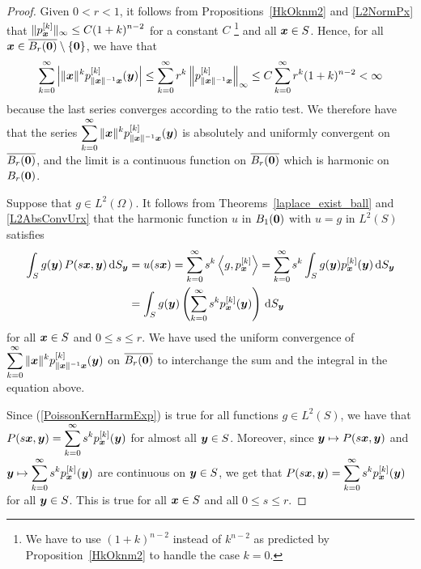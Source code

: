 \begin{proof}
Given $0 < r < 1$, it follows from Propositions~\ref{HkOknm2} and
\ref{L2NormPx} that
$\displaystyle \|p_{{\bm{x}}}^{[k]}\|_\infty \leq C (1+k)^{n-2}$
for a constant $C$ \footnote{We have to use $(1+k)^{n-2}$ instead of
$k^{n-2}$ as predicted by Proposition~\ref{HkOknm2} to handle the case $k=0$.}
and all ${\bm{x}} \in S$.  Hence, for all
${\bm{x}} \in \overline{B_r({\bm{0}})} \setminus\{{\bm{0}}\}$,
we have that
\begin{align*}
\sum_{k=0}^\infty \left| \|{\bm{x}}\|^k
p_{\|{\bm{x}}\|^{-1}{\bm{x}}}^{[k]}({\bm{y}}) \right|
\leq \sum_{k=0}^\infty r^k \left\|p_{\|{\bm{x}}\|^{-1}{\bm{x}}}^{[k]}\right\|_\infty
\leq C \sum_{k=0}^\infty  r^k (1+k)^{n-2}  < \infty
\end{align*}
because the last series converges according to the ratio test.
We therefore have that the series 
$\displaystyle \sum_{k=0}^\infty \|{\bm{x}}\|^k
p_{\|{\bm{x}}\|^{-1}{\bm{x}}}^{[k]}({\bm{y}})$
is absolutely and uniformly
convergent on $\overline{B_r({\bm{0}})}$, and the limit is a continuous
function on $\overline{B_r({\bm{0}})}$ which is harmonic on $B_r({\bm{0}})$.

Suppose that $\displaystyle g \in L^2(\Omega)$.
It follows from Theorems~\ref{laplace_exist_ball} and
\ref{L2AbsConvUrx} that the harmonic function $u$ in
$B_1({\bm{0}})$ with $u=g$ in $\displaystyle L^2(S)$ satisfies
\begin{equation} \label{PoissonKernHarmExp}
\begin{split}
\int_S g({\bm{y}}) \, P(s{\bm{x}},{\bm{y}}) \,\mathrm{d}{S}_{{\bm{y}}}
&= u(s{\bm{x}}) = \sum_{k=0}^\infty s^k \left\langle{g} , {p_{{\bm{x}}}^{[k]}}\right\rangle
= \sum_{k=0}^\infty s^k \int_S g({\bm{y}}) p_{{\bm{x}}}^{[k]}({\bm{y}}) \,\mathrm{d}{S}_{{\bm{y}}} \\
&= \int_S g({\bm{y}}) \left(\sum_{k=0}^\infty s^k
p_{{\bm{x}}}^{[k]}({\bm{y}})\right) \,\mathrm{d}{S}_{{\bm{y}}}
\end{split}
\end{equation}
for all ${\bm{x}} \in S$ and $0 \leq s \leq r$.
We have used the uniform convergence of
$\displaystyle \sum_{k=0}^\infty \|{\bm{x}}\|^k
p_{\|{\bm{x}}\|^{-1}{\bm{x}}}^{[k]}({\bm{y}})$ on
$\displaystyle \overline{B_r({\bm{0}})}$ to interchange the sum
and the integral in the equation above.  

Since (\ref{PoissonKernHarmExp}) is true for all functions
$\displaystyle g\in L^2(S)$,
we have that
$\displaystyle P(s{\bm{x}},{\bm{y}})
= \sum_{k=0}^\infty s^k p_{{\bm{x}}}^{[k]}({\bm{y}})$ for almost all
${\bm{y}} \in S$.  Moreover, since
$\displaystyle {\bm{y}} \mapsto P(s{\bm{x}},{\bm{y}})$ and
$\displaystyle {\bm{y}} \mapsto
\sum_{k=0}^\infty s^k p_{{\bm{x}}}^{[k]}({\bm{y}})$ are
continuous on ${\bm{y}} \in S$, we get that
$\displaystyle P(s{\bm{x}},{\bm{y}})
= \sum_{k=0}^\infty s^k p_{{\bm{x}}}^{[k]}({\bm{y}})$ for all
${\bm{y}} \in S$.  This is true for all ${\bm{x}} \in S$ and all
$0 \leq s \leq r$.


\end{proof}
